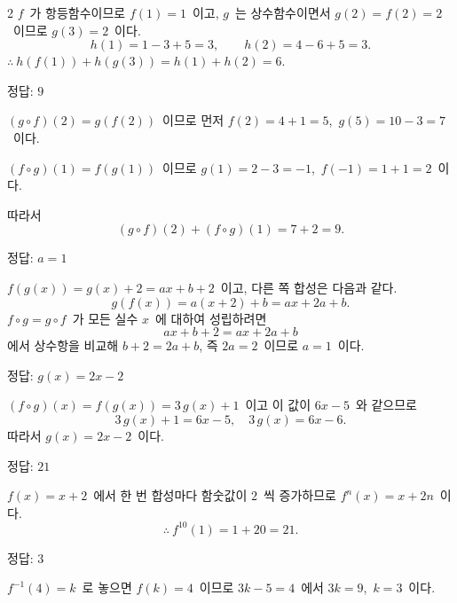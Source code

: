 \documentclass[10pt,fleqn]{article}
\begin{document}
\begin{multicols*}{2}
$f$\ 가 항등함수이므로 $f(1) = 1$\ 이고, $g$\ 는 상수함수이면서 $g(2) = f(2) = 2$\ 이므로 $g(3) = 2$\ 이다.
\[ h(1) = 1 - 3 + 5 = 3,\qquad h(2) = 4 - 6 + 5 = 3. \]
$\therefore\ h(f(1)) + h(g(3)) = h(1) + h(2) = 6$.

\begin{dmanswerbox}
정답: $9$
\end{dmanswerbox}

$(g \circ f)(2) = g(f(2))$\ 이므로 먼저 $f(2) = 4 + 1 = 5$,\ $g(5) = 10 - 3 = 7$\ 이다.

$(f \circ g)(1) = f(g(1))$\ 이므로 $g(1) = 2 - 3 = -1$,\ $f(-1) = 1 + 1 = 2$\ 이다.

따라서
\[ (g \circ f)(2) + (f \circ g)(1) = 7 + 2 = 9. \]

\begin{dmanswerbox}
정답: $a=1$
\end{dmanswerbox}

$f(g(x)) = g(x) + 2 = ax + b + 2$\ 이고, 다른 쪽 합성은 다음과 같다.
\[ g(f(x)) = a(x + 2) + b = ax + 2a + b. \]
$f \circ g = g \circ f$\ 가 모든 실수 $x$\ 에 대하여 성립하려면
\[ ax + b + 2 = ax + 2a + b \]
에서 상수항을 비교해 $b + 2 = 2a + b$, 즉 $2a = 2$\ 이므로 $a = 1$\ 이다.

\begin{dmanswerbox}
정답: $g(x)=2x-2$
\end{dmanswerbox}

$(f \circ g)(x) = f(g(x)) = 3\, g(x) + 1$\ 이고 이 값이 $6x - 5$\ 와 같으므로
\[ 3\, g(x) + 1 = 6x - 5,\quad 3\, g(x) = 6x - 6. \]
따라서 $g(x) = 2x - 2$\ 이다.

\begin{dmanswerbox}
정답: $21$
\end{dmanswerbox}

$f(x) = x + 2$\ 에서 한 번 합성마다 함숫값이 $2$\ 씩 증가하므로 $f^{n}(x) = x + 2n$\ 이다.
\[ \therefore\ f^{10}(1) = 1 + 20 = 21. \]

\begin{dmanswerbox}
정답: $3$
\end{dmanswerbox}

$f^{-1}(4) = k$\ 로 놓으면 $f(k) = 4$\ 이므로 $3k - 5 = 4$\ 에서 $3k = 9$,\ $k = 3$\ 이다.


\end{multicols*}
\end{document}

